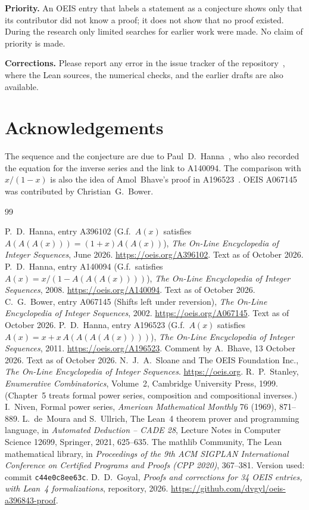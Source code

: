 \documentclass[11pt,a4paper]{article}
\theoremstyle{definition}
\theoremstyle{remark}
\newcommand{\para}[1]{\par\medskip\noindent\textbf{#1}\enspace}
\begin{document}
\para{Priority.} An OEIS entry that labels a statement as a conjecture shows only that its contributor did not know
a proof; it does not show that no proof existed. During the research only limited searches for earlier work were
made. No claim of priority is made.

\para{Corrections.} Please report any error in the issue tracker of the repository~\cite{repo}, where the Lean
sources, the numerical checks, and the earlier drafts are also available.

\section*{Acknowledgements}
The sequence and the conjecture are due to Paul~D.~Hanna~\cite{oeis}, who also recorded the equation for the inverse
series and the link to A140094. The comparison with $x/(1-x)$ is also the idea of Amol~Bhave's proof in
A196523~\cite{oeisB}. OEIS A067145 was contributed by Christian~G.~Bower.

\begin{thebibliography}{99}\small
\raggedright
{} P.~D.~Hanna, entry A396102 (G.f.\ $A(x)$ satisfies $A(A(A(x)))=(1+x)A(A(x))$), \emph{The On-Line Encyclopedia of Integer Sequences}, June 2026. \url{https://oeis.org/A396102}. Text as of October 2026.
 P.~D.~Hanna, entry A140094 (G.f.\ satisfies $A(x)=x/(1-A(A(A(x))))$), \emph{The On-Line Encyclopedia of Integer Sequences}, 2008. \url{https://oeis.org/A140094}. Text as of October 2026.
 C.~G.~Bower, entry A067145 (Shifts left under reversion), \emph{The On-Line Encyclopedia of Integer Sequences}, 2002. \url{https://oeis.org/A067145}. Text as of October 2026.
 P.~D.~Hanna, entry A196523 (G.f.\ $A(x)$ satisfies $A(x)=x+x\,A(A(A(A(x))))$), \emph{The On-Line Encyclopedia of Integer Sequences}, 2011. \url{https://oeis.org/A196523}. Comment by A.~Bhave, 13 October 2026. Text as of October 2026.
 N.~J.~A.~Sloane and The OEIS Foundation Inc., \emph{The On-Line Encyclopedia of Integer Sequences}. \url{https://oeis.org}.
 R.~P.~Stanley, \emph{Enumerative Combinatorics}, Volume~2, Cambridge University Press, 1999. (Chapter~5 treats formal power series, composition and compositional inverses.)
 I.~Niven, Formal power series, \emph{American Mathematical Monthly} 76 (1969), 871--889.
 L.~de~Moura and S.~Ullrich, The Lean~4 theorem prover and programming language, in \emph{Automated Deduction -- CADE 28}, Lecture Notes in Computer Science 12699, Springer, 2021, 625--635.
 The mathlib Community, The Lean mathematical library, in \emph{Proceedings of the 9th ACM SIGPLAN International Conference on Certified Programs and Proofs (CPP 2020)}, 367--381. Version used: commit \texttt{c44e0c8ee63c}.
 D.~D.~Goyal, \emph{Proofs and corrections for 34 OEIS entries, with Lean~4 formalizations}, repository, 2026. \url{https://github.com/dvgyl/oeis-a396843-proof}.
\end{thebibliography}
\end{document}
